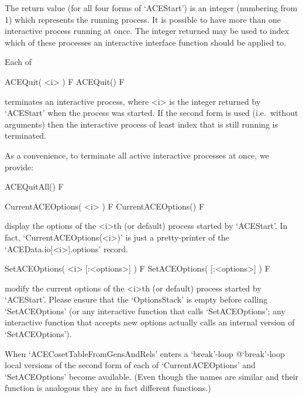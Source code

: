The return value (for all four forms  of  `ACEStart')  is  an  integer
(numbering from  1)  which  represents  the  running  process.  It  is
possible to have more than one interactive process  running  at  once.
The integer returned may be used to index which of these processes  an
interactive {\ACE} interface function should be applied to.

Each of

\>ACEQuit( <i> ) F
\>ACEQuit() F

terminates an interactive {\ACE} process, where  <i>  is  the  integer
returned by `ACEStart' when the process was  started.  If  the  second
form is used (i.e.~without arguments) then the interactive process  of
least index that is still running is terminated.

As a convenience, to terminate all active interactive {\ACE} processes
at once, we provide:

\>ACEQuitAll() F


\>CurrentACEOptions( <i> ) F
\>CurrentACEOptions() F

display the options of the  <i>th  (or  default)  process  started  by
`ACEStart'. In fact, `CurrentACEOptions(<i>)' is just a pretty-printer
of the `ACEData.io[<i>].options' record.

\>SetACEOptions( <i> [:<options>] ) F
\>SetACEOptions( [:<options>] ) F

modify the current options of the <i>th (or default)  process  started
by `ACEStart'. Please ensure that the `OptionsStack' is  empty  before
calling  `SetACEOptions'  (or  any  interactive  function  that  calls
`SetACEOptions'; any interactive function  that  accepts  new  options
actually calls an internal version of `SetACEOptions').

When `ACECosetTableFromGensAndRels' enters a  `break'-loop{\undoquotes
{} {@`break'-loop}} local versions  of  the  second
form  of  each  of  `CurrentACEOptions'  and  `SetACEOptions'   become
available. (Even though the names are similar and  their  function  is
analogous they are in fact different functions.)

\enditems



